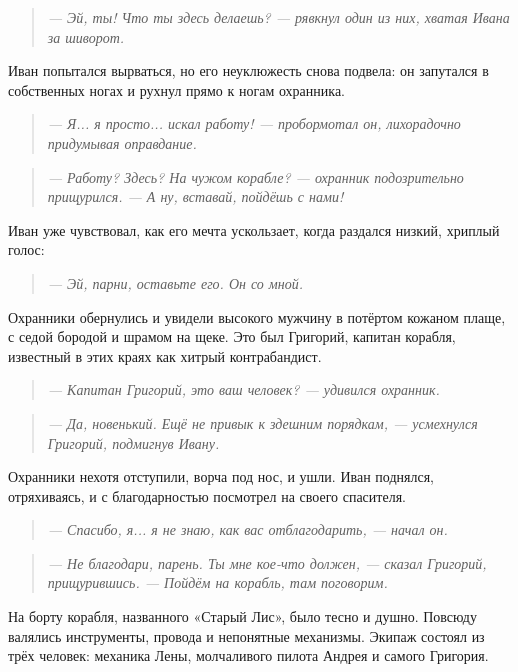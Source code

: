 \documentclass[12pt,a4paper]{book}
\newenvironment{dialogue}{\begin{quote}\itshape}{\end{quote}} %
\begin{document}
\begin{dialogue}
--- Эй, ты! Что ты здесь делаешь? --- рявкнул один из них, хватая Ивана за шиворот.
\end{dialogue}

Иван попытался вырваться, но его неуклюжесть снова подвела: он запутался в собственных ногах и рухнул прямо к ногам охранника.

\begin{dialogue}
--- Я... я просто... искал работу! --- пробормотал он, лихорадочно придумывая оправдание.
\end{dialogue}

\begin{dialogue}
--- Работу? Здесь? На чужом корабле? --- охранник подозрительно прищурился. --- А ну, вставай, пойдёшь с нами!
\end{dialogue}

Иван уже чувствовал, как его мечта ускользает, когда раздался низкий, хриплый голос:

\begin{dialogue}
--- Эй, парни, оставьте его. Он со мной.
\end{dialogue}

Охранники обернулись и увидели высокого мужчину в потёртом кожаном плаще, с седой бородой и шрамом на щеке. Это был Григорий, капитан корабля, известный в этих краях как хитрый контрабандист.

\begin{dialogue}
--- Капитан Григорий, это ваш человек? --- удивился охранник.
\end{dialogue}

\begin{dialogue}
--- Да, новенький. Ещё не привык к здешним порядкам, --- усмехнулся Григорий, подмигнув Ивану.
\end{dialogue}

Охранники нехотя отступили, ворча под нос, и ушли. Иван поднялся, отряхиваясь, и с благодарностью посмотрел на своего спасителя.

\begin{dialogue}
--- Спасибо, я... я не знаю, как вас отблагодарить, --- начал он.
\end{dialogue}

\begin{dialogue}
--- Не благодари, парень. Ты мне кое-что должен, --- сказал Григорий, прищурившись. --- Пойдём на корабль, там поговорим.
\end{dialogue}

На борту корабля, названного «Старый Лис», было тесно и душно. Повсюду валялись инструменты, провода и непонятные механизмы. Экипаж состоял из трёх человек: механика Лены, молчаливого пилота Андрея и самого Григория.
\end{document}
